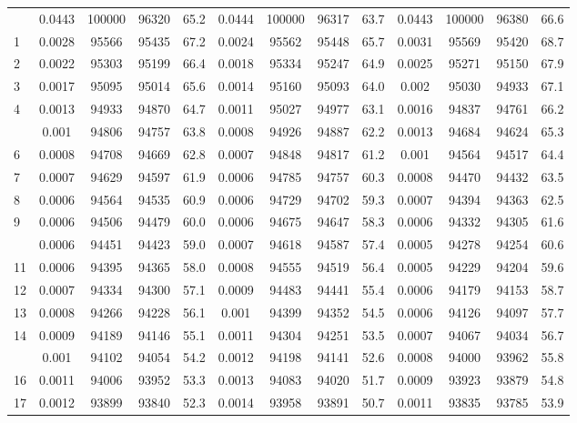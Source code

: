 \documentclass[
  14pt,
]{article}
\begin{document}
\begin{longtable}[t]{lcccccccccccc}
\endfoot
\bottomrule
\endlastfoot
0 & 0.0443 & 100000 & 96320 & 65.2 & 0.0444 & 100000 & 96317 & 63.7 & 0.0443 & 100000 & 96380 & 66.6\\
1 & 0.0028 & 95566 & 95435 & 67.2 & 0.0024 & 95562 & 95448 & 65.7 & 0.0031 & 95569 & 95420 & 68.7\\
2 & 0.0022 & 95303 & 95199 & 66.4 & 0.0018 & 95334 & 95247 & 64.9 & 0.0025 & 95271 & 95150 & 67.9\\
3 & 0.0017 & 95095 & 95014 & 65.6 & 0.0014 & 95160 & 95093 & 64.0 & 0.002 & 95030 & 94933 & 67.1\\
4 & 0.0013 & 94933 & 94870 & 64.7 & 0.0011 & 95027 & 94977 & 63.1 & 0.0016 & 94837 & 94761 & 66.2\\
\addlinespace
5 & 0.001 & 94806 & 94757 & 63.8 & 0.0008 & 94926 & 94887 & 62.2 & 0.0013 & 94684 & 94624 & 65.3\\
6 & 0.0008 & 94708 & 94669 & 62.8 & 0.0007 & 94848 & 94817 & 61.2 & 0.001 & 94564 & 94517 & 64.4\\
7 & 0.0007 & 94629 & 94597 & 61.9 & 0.0006 & 94785 & 94757 & 60.3 & 0.0008 & 94470 & 94432 & 63.5\\
8 & 0.0006 & 94564 & 94535 & 60.9 & 0.0006 & 94729 & 94702 & 59.3 & 0.0007 & 94394 & 94363 & 62.5\\
9 & 0.0006 & 94506 & 94479 & 60.0 & 0.0006 & 94675 & 94647 & 58.3 & 0.0006 & 94332 & 94305 & 61.6\\
\addlinespace
10 & 0.0006 & 94451 & 94423 & 59.0 & 0.0007 & 94618 & 94587 & 57.4 & 0.0005 & 94278 & 94254 & 60.6\\
11 & 0.0006 & 94395 & 94365 & 58.0 & 0.0008 & 94555 & 94519 & 56.4 & 0.0005 & 94229 & 94204 & 59.6\\
12 & 0.0007 & 94334 & 94300 & 57.1 & 0.0009 & 94483 & 94441 & 55.4 & 0.0006 & 94179 & 94153 & 58.7\\
13 & 0.0008 & 94266 & 94228 & 56.1 & 0.001 & 94399 & 94352 & 54.5 & 0.0006 & 94126 & 94097 & 57.7\\
14 & 0.0009 & 94189 & 94146 & 55.1 & 0.0011 & 94304 & 94251 & 53.5 & 0.0007 & 94067 & 94034 & 56.7\\
\addlinespace
15 & 0.001 & 94102 & 94054 & 54.2 & 0.0012 & 94198 & 94141 & 52.6 & 0.0008 & 94000 & 93962 & 55.8\\
16 & 0.0011 & 94006 & 93952 & 53.3 & 0.0013 & 94083 & 94020 & 51.7 & 0.0009 & 93923 & 93879 & 54.8\\
17 & 0.0012 & 93899 & 93840 & 52.3 & 0.0014 & 93958 & 93891 & 50.7 & 0.0011 & 93835 & 93785 & 53.9\\

\end{longtable}
\end{document}
